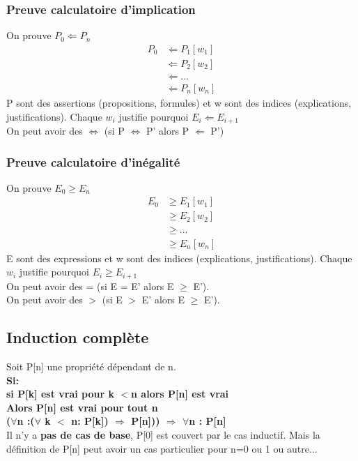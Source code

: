 \subsubsection{Preuve calculatoire d'implication}
On prouve $P_0\Leftarrow P_n$
\begin{align*}
P_0 &\Leftarrow P_1 [w_1]\\
&\Leftarrow P_2 [w_2]\\
&\Leftarrow ...\\
&\Leftarrow P_n [w_n]
\end{align*}
P sont des assertions (propositions, formules) et w sont des indices (explications, justifications). Chaque $w_i$ justifie pourquoi $E_i \Leftarrow E_{i+1}$\\
On peut avoir des $\Leftrightarrow$ (si P $\Leftrightarrow$ P' alors P $\Leftarrow$ P')
\subsubsection{Preuve calculatoire d'inégalité}
On prouve $E_0 \geq E_n$
\begin{align*}
E_0 &\geq E_1 [w_1]\\
&\geq E_2 [w_2]\\
&\geq ...\\
&\geq E_n [w_n]
\end{align*}
E sont des expressions et w sont des indices (explications, justifications). Chaque $w_i$ justifie pourquoi $E_i \geq E_{i+1}$\\
On peut avoir des = (si E = E' alors E $\geq$ E').\\
On peut avoir des $>$ (si E $>$ E' alors E $\geq$ E').
\vfill

\subsection{Induction complète}
Soit P[n] une propriété dépendant de n.\\
\textbf{Si:\\ si P[k] est vrai pour k $<$n alors P[n] est vrai \\  Alors P[n] est vrai pour tout n}\\

\textbf {($\forall$n :($\forall$ k $<$ n: P[k]) $\Rightarrow$ P[n])) $\Rightarrow$ $\forall$n : P[n]}\\

Il n'y a \textbf{pas de cas de base}, P[0] est couvert par le cas inductif. Mais la définition de P[n] peut avoir un cas particulier pour n=0 ou 1 ou autre...\\

